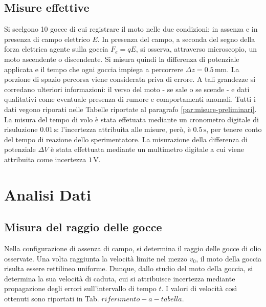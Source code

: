 \documentclass[]{article}
\let\oldsection\section%
\renewcommand{\section}{%
	\renewcommand{\theequation}{\thesection.\arabic{equation}}%
	\oldsection}%
\let\oldsubsection\subsection%
\renewcommand{\subsection}{%
	\renewcommand{\theequation}{\thesubsection.\arabic{equation}}%
	\oldsubsection}%
\begin{document}
    \subsection {Misure effettive}
    Si scelgono 10 gocce di cui registrare il moto nelle due condizioni: in assenza e in presenza di campo elettrico $ E $. In presenza del campo, a seconda del segno della forza elettrica agente sulla goccia $F_e = qE$, si osserva, attraverso microscopio, un moto ascendente o discendente. Si misura quindi la differenza di potenziale applicata e il tempo che ogni goccia impiega a percorrere $ \Delta z = 0.5 \, \text{mm} $. La porzione di spazio percorsa viene considerata priva di errore. A tali grandezze si corredano ulteriori informazioni: il verso del moto - se sale o se scende - e dati qualitativi come eventuale presenza di rumore e comportamenti anomali.
    Tutti i dati vegono riporati nelle Tabelle riportate al paragrafo \ref{par:misure-preliminari}. \\ 
    
    La misura del tempo di volo è stata effetuata mediante un cronometro digitale di risuluzione $ 0.01 \, \text{s} $: l'incertezza attribuita alle misure, però, è $0.5 \, \text{s}$, per tenere conto del tempo di reazione dello sperimentatore. La misurazione della differenza di potenziale $ \Delta V $ è stata effettuata mediante un multimetro digitale a cui viene attribuita come incertezza $ 1 \, \text{V} $.


    \section{Analisi Dati}
    \subsection{Misura del raggio delle gocce}
    Nella configurazione di assenza di campo, si determina il raggio delle gocce di olio osservate.
    Una volta raggiunta la velocità limite nel mezzo $v_0$, il moto della goccia risulta essere rettilineo uniforme. Dunque, dallo studio del moto della goccia, si determina la sua velocità di caduta, cui si attribuisce incertezza mediante propagazione degli errori sull'intervallo di tempo $t$. I valori di velocità così ottenuti sono riportati in Tab. $riferimento-a-tabella$.
\end{document}
